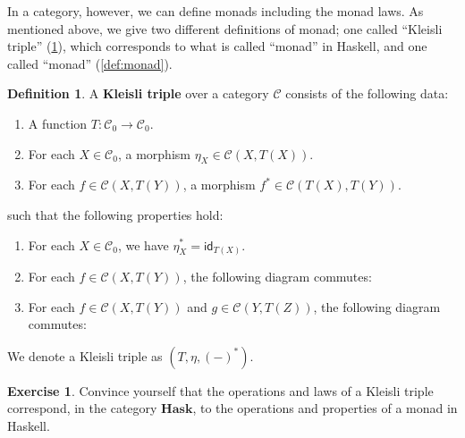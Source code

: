 \documentclass[a4paper,11pt, oneside,titlepage=false]{scrbook}
\theoremstyle{plain}
\theoremstyle{definition}
\newtheorem{dfn}[thm]{Definition}
\newtheorem{exer}[thm]{Exercise}
\newcommand{\cfont}[1]{\ensuremath{\mathsf{#1}}}
\newcommand{\Cat}[1]{\mathcal{#1}}
\newcommand{\CC}{\Cat{C}}
\newcommand{\Catb}[1]{\mathbf{#1}}
\newcommand{\HASK}{\Catb{Hask}}
\newcommand{\Ob}[1]{{#1}_0}
\newcommand{\CHom}[3]{{#1}(#2,#3)}
\newcommand{\Id}[1][]{\cfont{id}_{#1}}
\newcommand{\co}[2]{\ensuremath{#2 \circ #1}}
\begin{document}
In a category, however, we can define monads including the monad laws.
As mentioned above, we give two different definitions of monad;
one called ``Kleisli triple'' (\cref{def:kleisli-triple}), which corresponds to what is called ``monad'' in Haskell,
and one called ``monad'' (\cref{def:monad}).


\begin{dfn}\label{def:kleisli-triple}
  A \textbf{Kleisli triple} over a category $\CC$ consists of the following data:
\begin{enumerate}
\item A function $T: \Ob{\CC}\to \Ob{\CC}$.
\item For each $X\in\Ob{\CC}$, a morphism $\eta_X \in \CHom{\CC}{X}{T(X)}$.
\item For each $f\in\CHom{\CC}{X}{T(Y)}$, a morphism $f^{*} \in \CHom{\CC}{T(X)}{T(Y)}$.
\end{enumerate}
such that the following properties hold:
\begin{enumerate}[resume]
\item For each $X \in \Ob\CC$, we have $\eta_X^{*} = \Id[T(X)]$.
\item For each $f\in\CHom{\CC}{X}{T(Y)}$, the following diagram commutes:
\begin{center}
\end{center}
\item For each $f\in\CHom{\CC}{X}{T(Y)}$ and $g\in\CHom{\CC}{Y}{T(Z)}$, the following diagram commutes:
\begin{center}
\end{center}
\end{enumerate}
We denote a Kleisli triple as $(T,\eta, (-)^{*})$.
\end{dfn}

\begin{exer}
  Convince yourself that the operations and laws of a Kleisli triple correspond, in the category $\HASK$, to the operations and properties of a monad in Haskell.
\end{exer}
\end{document}
